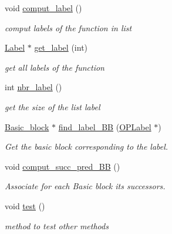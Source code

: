 \begin{DoxyCompactItemize}
\item 
\hypertarget{class_function_a1c8830219ce4306c22a933b17f54cc6f}{void \hyperlink{class_function_a1c8830219ce4306c22a933b17f54cc6f}{comput\-\_\-label} ()}\label{class_function_a1c8830219ce4306c22a933b17f54cc6f}

\begin{DoxyCompactList}\small\item\em comput labels of the function in list \end{DoxyCompactList}\item 
\hypertarget{class_function_a4b2e9837c4b506b3c7a6d1488d9914d1}{\hyperlink{class_label}{Label} $\ast$ \hyperlink{class_function_a4b2e9837c4b506b3c7a6d1488d9914d1}{get\-\_\-label} (int)}\label{class_function_a4b2e9837c4b506b3c7a6d1488d9914d1}

\begin{DoxyCompactList}\small\item\em get all labels of the function \end{DoxyCompactList}\item 
\hypertarget{class_function_a3f3807e12e695ffe23e1ef44edcd262b}{int \hyperlink{class_function_a3f3807e12e695ffe23e1ef44edcd262b}{nbr\-\_\-label} ()}\label{class_function_a3f3807e12e695ffe23e1ef44edcd262b}

\begin{DoxyCompactList}\small\item\em get the size of the list label \end{DoxyCompactList}\item 
\hypertarget{class_function_ae55c0232d0eced8830daf57293229db8}{\hyperlink{class_basic__block}{Basic\-\_\-block} $\ast$ \hyperlink{class_function_ae55c0232d0eced8830daf57293229db8}{find\-\_\-label\-\_\-\-B\-B} (\hyperlink{class_o_p_label}{O\-P\-Label} $\ast$)}\label{class_function_ae55c0232d0eced8830daf57293229db8}

\begin{DoxyCompactList}\small\item\em Get the basic block corresponding to the label. \end{DoxyCompactList}\item 
\hypertarget{class_function_a3c52c8cb82e0137f02771331018b655c}{void \hyperlink{class_function_a3c52c8cb82e0137f02771331018b655c}{comput\-\_\-succ\-\_\-pred\-\_\-\-B\-B} ()}\label{class_function_a3c52c8cb82e0137f02771331018b655c}

\begin{DoxyCompactList}\small\item\em Associate for each Basic block its successors. \end{DoxyCompactList}\item 
\hypertarget{class_function_aaa0d06640a5075c416106a88bd9a833a}{void \hyperlink{class_function_aaa0d06640a5075c416106a88bd9a833a}{test} ()}\label{class_function_aaa0d06640a5075c416106a88bd9a833a}

\begin{DoxyCompactList}\small\item\em method to test other methods \end{DoxyCompactList}\end{DoxyCompactItemize}


